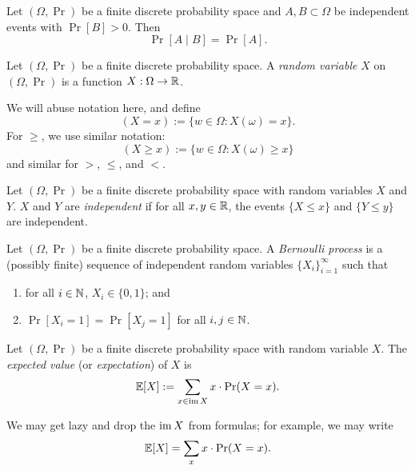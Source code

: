 \begin{proposition}
    Let $(\Omega, \Pr)$ be a finite discrete probability space and $A, B \subset \Omega$ be independent events with $\Pr[B] > 0$. Then
    \[ \Pr[A \mid B] = \Pr[A]. \]
\end{proposition}

\begin{definition}
    Let $(\Omega, \Pr)$ be a finite discrete probability space. A \emph{random variable} $X$ on $(\Omega, \Pr)$ is a function $X: \Omega \to \mathbb R$.
\end{definition}

\begin{remark}
    We will abuse notation here, and define
    \[ (X = x) := \{w \in \Omega: X(\omega) = x\}. \]
    For $\geq$, we use similar notation:
    \[ (X \geq x) := \{w \in \Omega: X(\omega) \geq x\} \]
    and similar for $>$, $\leq$, and $<$. 
\end{remark}

\begin{definition}
    Let $(\Omega, \Pr)$ be a finite discrete probability space with random variables $X$ and $Y$. $X$ and $Y$ are \emph{independent} if for all $x, y \in \mathbb R$, the events $\{X \leq x\}$ and $\{Y \leq y\}$ are independent. 
\end{definition}

\begin{definition}
    Let $(\Omega, \Pr)$ be a finite discrete probability space. A \emph{Bernoulli process} is a (possibly finite) sequence of independent random variables $\{X_i\}_{i=1}^\infty$ such that
    \begin{enumerate}
        \item for all $i \in \mathbb N$, $X_i \in \{0,1\}$; and
        \item $\Pr[X_i = 1] = \Pr[X_j = 1]$ for all $i,j \in \mathbb N$.
    \end{enumerate} 
\end{definition}

\begin{definition}[Expectation]
    Let $(\Omega, \Pr)$ be a finite discrete probability space with random variable $X$. The \emph{expected value} (or \emph{expectation}) of $X$ is
    \[ \mathbb E[X] := \sum_{x \in \operatorname{im} X} x \cdot \Pr(X = x). \]
\end{definition}

\begin{remark}
    We may get lazy and drop the $\operatorname{im} X$ from formulas; for example, we may write    
    \[ \mathbb E[X] = \sum_{x} x \cdot \Pr(X = x). \]
\end{remark}

